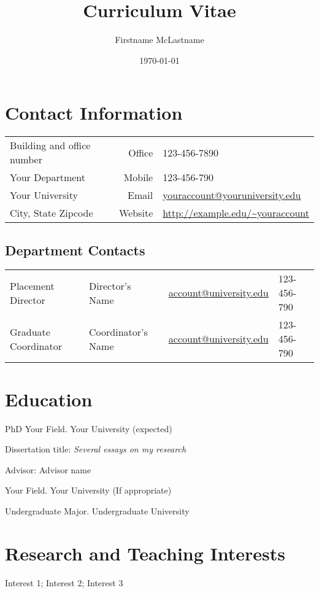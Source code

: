 \documentclass[12pt]{safecv}%
\author{Firstname McLastname}
\title{Curriculum Vitae}
\date{\today}
\begin{document}
\maketitle
\section*{Contact Information}
\begin{tabular}{@{}lrl@{}}
Building and office number & Office  & 123-456-7890                         \\
Your Department            & Mobile  & 123-456-790                          \\
Your University            & Email   & \url{youraccount@youruniversity.edu} \\
City, State Zipcode        & Website & \url{http://example.edu/~youraccount} %
\end{tabular}

\subsection*{Department Contacts}
\begin{tabular}{@{}llll@{}}
Placement Director & Director's Name & \url{account@university.edu} & 123-456-790 \\
Graduate Coordinator & Coordinator's Name & \url{account@university.edu} & 123-456-790
\end{tabular}

\section*{Education}

\begin{description}[noitemsep]
\item[year] PhD Your Field. Your University (expected)
\item Dissertation title: \textit{Several essays on my research} %
\item Advisor: Advisor name
\item[year]  Your Field. Your University (If appropriate)
\item[year]  Undergraduate Major. Undergraduate University
\end{description}

\section*{Research and Teaching Interests}
Interest 1; Interest 2; Interest 3
\end{document}
